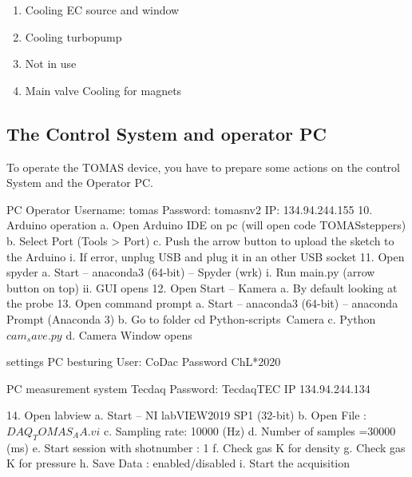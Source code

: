 \documentclass[fleqn,a4paper,20pt]{article}
\begin{document}
\begin{enumerate}
	\item Cooling EC source and window
	\item Cooling turbopump
	\item Not in use
	\item Main valve Cooling for magnets
\end{enumerate}


\newpage
\subsection{The Control System and operator PC}

To operate the TOMAS device, you have to prepare some actions on the control System and the Operator PC.


PC Operator
Username: tomas
Password: tomasnv2
IP: 134.94.244.155
10.	Arduino operation
a.	Open Arduino IDE on pc (will open code TOMASsteppers)
b.	Select Port (Tools > Port)
c.	Push the arrow button to upload the sketch to the Arduino
i.	If error, unplug USB and plug it in an other USB socket
11.	Open spyder
a.	Start – anaconda3 (64-bit) – Spyder (wrk)
i.	Run main.py (arrow button on top)
ii.	GUI opens
12.	Open Start – Kamera
a.	By default looking at the probe
13.	Open command prompt
a.	Start – anaconda3 (64-bit) – anaconda Prompt (Anaconda 3)
b.	Go to folder cd Python-scripts\ Camera
c.	Python $cam_save.py$
d.	Camera Window opens

settings
PC besturing
User: CoDac
Password ChL*2020


PC measurement system
Tecdaq
Password: TecdaqTEC
IP 134.94.244.134

14.	Open labview
a.	Start – NI labVIEW2019 SP1 (32-bit)
b.	Open File : $DAQ_TOMAS_AA.vi$
c.	Sampling rate: 10000 (Hz)
d.	Number of samples =30000 (ms)
e.	Start session with shotnumber : 1
f.	Check gas K for density
g.	Check gas K for pressure
h.	Save Data : enabled/disabled
i.	Start the acquisition





\newpage
\end{document}
